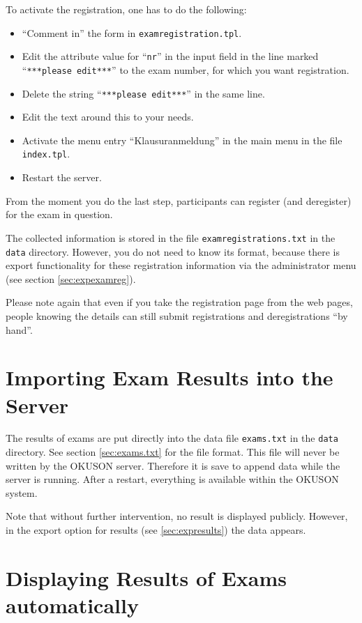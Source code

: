 \documentclass[12pt,openany,a4paper]{book}
\newcommand{\OKUSON}{\textsf{OKUSON}}
\begin{document}
To activate the registration, one has to do the following: 
\begin{itemize}
\item ``Comment in'' the form in \texttt{examregistration.tpl}.
\item Edit the attribute value for ``\texttt{nr}'' in the input field
in the line marked ``\texttt{***please edit***}'' to the exam number, for
which you want registration.
\item Delete the string ``\texttt{***please edit***}'' in the same line.
\item Edit the text around this to your needs.
\item Activate the menu entry ``Klausuranmeldung'' in the main menu in the
file \texttt{index.tpl}.
\item Restart the server.
\end{itemize}

From the moment you do the last step, participants can register (and 
deregister) for the exam in question.

The collected information is stored in the file \texttt{examregistrations.txt}
in the \texttt{data} directory. However, you do not need to know its format,
because there is export functionality for these registration information via
the administrator menu (see section \ref{sec:expexamreg}).

Please note again that even if you take the registration page from the
web pages, people knowing the details can still submit registrations and
deregistrations ``by hand''.

\section{Importing Exam Results into the Server}

The results of exams are put directly into the data file \texttt{exams.txt}
in the \texttt{data} directory. See section \ref{sec:exams.txt} for the
file format. This file will never be written by the {\OKUSON} server. 
Therefore it is save to append data while the server is running. After 
a restart, everything is available within the {\OKUSON} system.

Note that without further intervention, no result is displayed publicly.
However, in the export option for results (see \ref{sec:expresults}) the
data appears.

\section{Displaying Results of Exams automatically}
\end{document}
